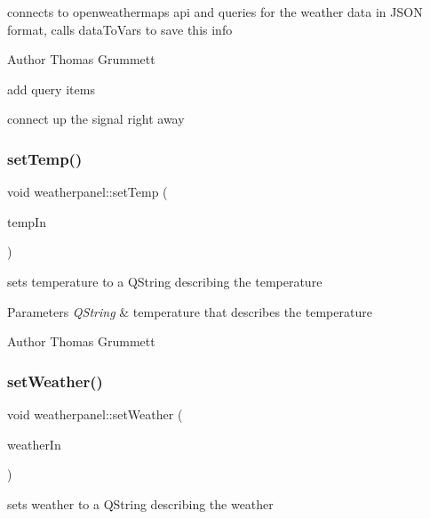 connects to openweathermaps api and queries for the weather data in J\+S\+ON format, calls data\+To\+Vars to save this info 

\begin{DoxyAuthor}{Author}
Thomas Grummett 
\end{DoxyAuthor}
add query items

connect up the signal right away \mbox{\label{classweatherpanel_a3869138bae14bb7223e78541ddb45ae9}} 
\subsubsection{\texorpdfstring{set\+Temp()}{setTemp()}}
{\footnotesize\ttfamily void weatherpanel\+::set\+Temp (\begin{DoxyParamCaption}\item[{Q\+String}]{temp\+In }\end{DoxyParamCaption})}



sets temperature to a Q\+String describing the temperature 


\begin{DoxyParams}{Parameters}
{\em Q\+String} & temperature that describes the temperature \\
\hline
\end{DoxyParams}
\begin{DoxyAuthor}{Author}
Thomas Grummett 
\end{DoxyAuthor}
\mbox{\label{classweatherpanel_aa289deea2382682a44450048c5d8dafb}} 
\subsubsection{\texorpdfstring{set\+Weather()}{setWeather()}}
{\footnotesize\ttfamily void weatherpanel\+::set\+Weather (\begin{DoxyParamCaption}\item[{Q\+String}]{weather\+In }\end{DoxyParamCaption})}



sets weather to a Q\+String describing the weather 


